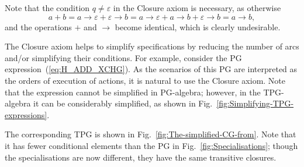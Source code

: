 Note that the condition $q\ne\varepsilon$ in the Closure axiom is
necessary, as otherwise
\[
a+b=a\!\rightarrow\!\varepsilon+\varepsilon\!\rightarrow\! b=a\!\rightarrow\!\varepsilon+a\!\rightarrow\! b+\varepsilon\!\rightarrow\! b=a\!\rightarrow\! b,
\]
and the operations $+$ and $\rightarrow$ become identical, which
is clearly undesirable.

The Closure axiom helps to simplify specifications by reducing the
number of arcs and/or simplifying their conditions. For example, consider
the PG expression~(\ref{eq:H_ADD_XCHG}). As the scenarios of this
PG are interpreted as the orders of execution of actions, it is natural
to use the Closure axiom. Note that the expression cannot be simplified
in PG-algebra; however, in the TPG-algebra it can be considerably
simplified, as shown in Fig.~\ref{fig:Simplifying-TPG-expressions}.

The corresponding TPG is shown in Fig.~\ref{fig:The-simplified-CG-from}.
Note that it has fewer conditional elements than the PG in Fig.~\ref{fig:Specialisations};
though the specialisations are now different, they have the same transitive
closures.

